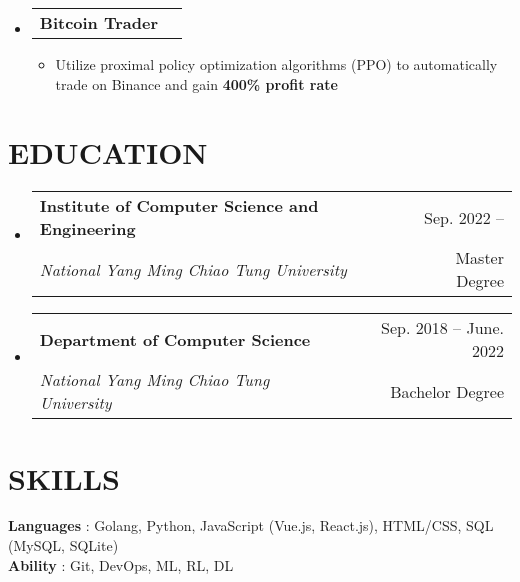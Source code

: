 \documentclass[letterpaper,11pt]{article}
\makeatletter
\newcommand{\resumeItem}[1]{
  \item\small{
    {#1 \vspace{-1pt}}
  }
}
\newcommand{\resumeSubheading}[4]{
  \vspace{-1pt}\item
    \begin{tabular*}{\textwidth}[t]{l@{\extracolsep{\fill}}r}
      \textbf{#1} & {\color{dark-grey}\small #2}\vspace{1pt}\\ %
      \textit{#3} & {\color{dark-grey} \small #4}\\ %
    \end{tabular*}\vspace{-4pt}
}
\newcommand{\resumeProjectHeading}[2]{
    \item
    \begin{tabular*}{\textwidth}{l@{\extracolsep{\fill}}r}
      #1 & {\color{dark-grey}} \\
    \end{tabular*}\vspace{-4pt}
}
\newcommand{\resumeSubHeadingListStart}{\begin{itemize}[leftmargin=0in, label={}]}
\newcommand{\resumeSubHeadingListEnd}{\end{itemize}}
\newcommand{\resumeItemListStart}{\begin{itemize}}
\newcommand{\resumeItemListEnd}{\end{itemize}\vspace{0pt}}
\makeatother
\begin{document}
    \resumeSubHeadingListStart
        \resumeProjectHeading
          {\textbf{Bitcoin Trader} \href{https://arxiv.org/abs/1707.06347}{\faFile}}{}
          \resumeItemListStart
            \resumeItem{Utilize proximal policy optimization algorithms (PPO) to automatically trade on Binance and gain \textbf{400\% profit rate} }
          \resumeItemListEnd
    \resumeSubHeadingListEnd



\section {EDUCATION}
  \resumeSubHeadingListStart
  \resumeSubheading
    {Institute of Computer Science and Engineering}{Sep. 2022 -- }
    {National Yang Ming Chiao Tung University}{Master Degree}
  \resumeSubHeadingListEnd
  \resumeSubHeadingListStart
    \resumeSubheading
      {Department of Computer Science}{Sep. 2018 -- June. 2022}
      {National Yang Ming Chiao Tung University}{Bachelor Degree}
  \resumeSubHeadingListEnd


%
\section{SKILLS}
 \begin{itemize}[leftmargin=0in, label={}]
    \small{\item{
     \textbf{Languages} {: Golang, Python, JavaScript (Vue.js, React.js), HTML/CSS, SQL (MySQL, SQLite)}\vspace{2pt} \\
     \textbf{Ability}   {: Git, DevOps, ML, RL, DL}
    }}
 \end{itemize}


\end{document}
